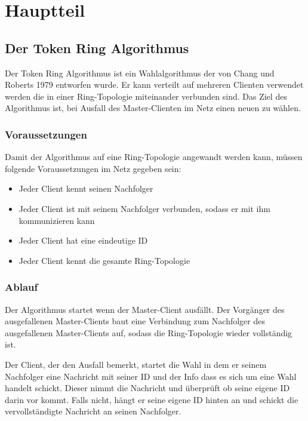 \section{Hauptteil} 

\subsection{Der Token Ring Algorithmus}
Der Token Ring Algorithmus ist ein Wahlalgorithmus der von Chang und Roberts 1979 entworfen wurde. Er kann verteilt auf mehreren Clienten verwendet werden die in einer Ring-Topologie miteinander verbunden sind. Das Ziel des Algorithmus ist, bei Ausfall des Master-Clienten im Netz einen neuen zu wählen.

\subsubsection*{Voraussetzungen}
Damit der Algorithmus auf eine Ring-Topologie angewandt werden kann, müssen folgende Voraussetzungen im Netz gegeben sein:
\begin{itemize}
	\item Jeder Client kennt seinen Nachfolger
	\item Jeder Client ist mit seinem Nachfolger verbunden, sodass er mit ihm kommunizieren kann
	\item Jeder Client hat eine eindeutige ID
	\item Jeder Client kennt die gesamte Ring-Topologie
\end{itemize}

\subsubsection*{Ablauf}
\label{sec:algorithm_process}
Der Algorithmus startet wenn der Master-Client ausfällt. Der Vorgänger des ausgefallenen Master-Clients baut eine Verbindung zum Nachfolger des ausgefallenen Master-Clients auf, sodass die Ring-Topologie wieder vollständig ist.

Der Client, der den Ausfall bemerkt, startet die Wahl in dem er seinem Nachfolger eine Nachricht mit seiner ID und der Info dass es sich um eine Wahl handelt schickt. Dieser nimmt die Nachricht und überprüft ob seine eigene ID darin vor kommt. Falls nicht, hängt er seine eigene ID hinten an und schickt die vervollständigte Nachricht an seinen Nachfolger.


